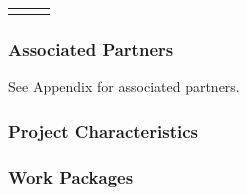 \documentclass[
  11pt,
]{article}
\begin{document}
\begin{longtable}[c]{|p{1.00in}|p{0.60in}|p{5.00in}}
\noalign{\global\setlength{\arrayrulewidth}{2pt}}\arrayrulecolor[HTML]{666666}\cline{1-3}

\end{longtable}

\hypertarget{associated-partners}{%
\subsubsection{Associated Partners}\label{associated-partners}}

See Appendix for associated partners.

\hypertarget{project-characteristics}{%
\subsubsection{Project Characteristics}\label{project-characteristics}}

\hypertarget{work-packages}{%
\subsubsection{Work Packages}\label{work-packages}}

\providecommand{\docline}[3]{\noalign{\global\setlength{\arrayrulewidth}{#1}}\arrayrulecolor[HTML]{#2}\cline{#3}}

\setlength{\tabcolsep}{2pt}

\renewcommand*{\arraystretch}{1.5}
\end{document}

